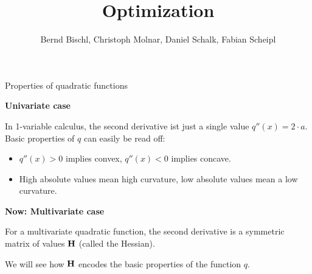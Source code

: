 




\title{Optimization}
\author{Bernd Bischl, Christoph Molnar, Daniel Schalk, Fabian Scheipl}
\date{}



\sloppy


\begin{vbframe}{Properties of quadratic functions}

  \textbf{Univariate case} \vspace*{0.2cm}
  
  In 1-variable calculus, the second derivative ist just a single value $q''(x) = 2 \cdot a$. Basic properties of $q$ can easily be read off: 
  
  \begin{itemize}
    \item $q''(x) > 0$ implies convex, $q''(x) < 0$  implies concave.
    \item High absolute values mean high curvature, low absolute values mean a low curvature. 
  \end{itemize}
  
  \vspace*{0.2cm}
  
  \textbf{Now: Multivariate case}\vspace*{0.2cm}
  
  For a multivariate quadratic function, the second derivative is a symmetric matrix of values $\bf{H}$ (called the Hessian). 
  
  \lz 
  
  We will see how $\bf{H}$ encodes the basic properties of the function $q$. 
  
  \end{vbframe}
  
